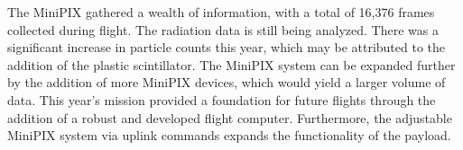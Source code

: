 The MiniPIX gathered a wealth of information, with a total of 16,376 frames collected during flight.  The radiation data is still being analyzed. There was a significant increase in particle counts this year, which may be attributed to the addition of the plastic scintillator. The MiniPIX system can be expanded further by the addition of more MiniPIX devices, which would yield a larger volume of data. This year's mission provided a foundation for future flights through the addition of a robust and developed flight computer.  Furthermore, the adjustable MiniPIX system via uplink commands expands the functionality of the payload.
%
%
